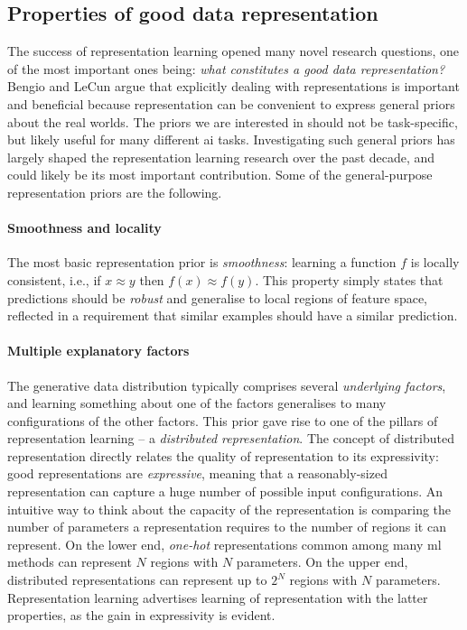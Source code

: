 \subsection{Properties of good data representation}
\label{ch3:sec:properties}


The success of representation learning opened many novel research questions, one of the most important ones being: \textit{what constitutes a good data representation?}
Bengio and LeCun \cite{Bengio2013RLR} argue that explicitly dealing with representations is important and beneficial because representation can be convenient to express general priors about the real worlds.
The priors we are interested in should not be task-specific, but likely useful for many different \gls{ai} tasks.
Investigating such general priors has largely shaped the representation learning research over the past decade, and could likely be its most important contribution.
Some of the general-purpose representation priors are the following.



\paragraph{\textbf{Smoothness and locality}}
The most basic representation prior is \textit{smoothness}: learning a function $f$ is locally consistent, i.e., if $ x \approx y$ then $f(x) \approx f(y)$.
This property simply states that predictions should be \textit{robust} and generalise to local regions of feature space, reflected in a requirement that similar examples should have a similar prediction.




\paragraph{\textbf{Multiple explanatory factors}}
The generative data distribution typically comprises several \textit{underlying factors}, and learning something about one of the factors generalises to many configurations of the other factors.
This prior gave rise to one of the pillars of representation learning -- a  \textit{distributed representation}.
The concept of distributed representation directly relates the quality of representation to its expressivity: good representations are \textit{expressive}, meaning that a reasonably-sized representation can capture a huge number of possible input configurations.
An intuitive way to think about the capacity of the representation is comparing the number of parameters a representation requires to the number of regions it can represent.
On the lower end, \textit{one-hot} representations common among many \gls{ml} methods can represent $N$ regions with $N$ parameters.
On the upper end, distributed representations can represent up to $2^N$ regions with $N$ parameters.
Representation learning advertises learning of representation with the latter properties, as the gain in expressivity is evident.



